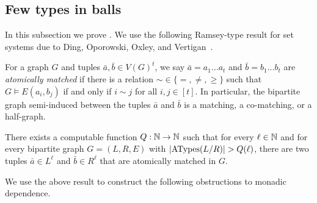 
    
\subsection{Few types in balls}\label{sec:few-types-in-balls}
In this subsection we prove .
We use the following Ramsey-type result for set systems due to Ding, Oporowski, Oxley, and Vertigan~\cite{DBLP:journals/jct/DingOOV96}.

\begin{definition}
    For a graph $G$ and tuples $\bar a, \bar b \in V(G)^t$, we say $\bar a = a_1 \ldots a_t$ and $\bar b = b_1 \ldots b_t$ are \emph{atomically matched} 
    if there is a relation ${\sim} \in \{=,\neq,\geq\}$ such that $G \models E(a_i, b_j)$ if and only if $i \sim j$ for all $i,j \in [t]$.
    In particular, the bipartite graph semi-induced between the tuples $\bar a$ and $\bar b$ is a matching, a co-matching, or a half-graph.
\end{definition}

\begin{theorem}\label{thm:matching}
    There exists a computable function $Q:\mathbb N\rightarrow\mathbb N$ such that for every $\ell\in\mathbb N$ and for every bipartite graph $G = (L,R,E)$ with
    $|\mathrm{ATypes}(L/R)| > Q(\ell)$, there are two tuples $\bar a \in L^\ell$ and $\bar b \in R^\ell$ that are atomically matched in $G$.
\end{theorem}

We use the above result to construct the following obstructions to monadic dependence.

